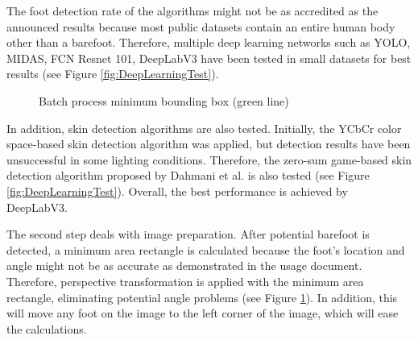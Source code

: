 The foot detection rate of the algorithms might not be as accredited as the announced results because most public datasets contain an entire human body other than a barefoot. Therefore, multiple deep learning networks such as YOLO, MIDAS, FCN Resnet 101, DeepLabV3 have been tested in small datasets for best results (see Figure \ref{fig:DeepLearningTest}).

\begin{figure}[htbp]
\centering
{}
\caption{Batch process minimum bounding box (green line)}
\label{fig:BatchProcessMinimumBoundingBox}
\end{figure}

In addition, skin detection algorithms are also tested. Initially, the YCbCr color space-based skin detection algorithm was applied, but detection results have been unsuccessful in some lighting conditions. Therefore, the zero-sum game-based skin detection algorithm proposed by Dahmani et al. \cite{dahmani2020zero} is also tested (see Figure \ref{fig:DeepLearningTest}). Overall, the best performance is achieved by DeepLabV3.

The second step deals with image preparation. After potential barefoot is detected, a minimum area rectangle is calculated because the foot's location and angle might not be as accurate as demonstrated in the usage document. Therefore, perspective transformation is applied with the minimum area rectangle, eliminating potential angle problems (see Figure \ref{fig:BatchProcessMinimumBoundingBox}). In addition, this will move any foot on the image to the left corner of the image, which will ease the calculations.

